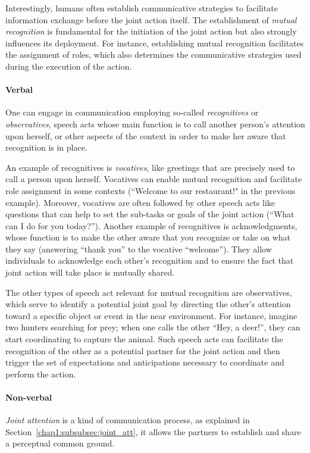 \documentclass[a4paper,11pt,twoside]{StyleThese}
\begin{document}
Interestingly, humans often establish communicative strategies to facilitate information exchange before the joint action itself. The establishment of \emph{mutual recognition} is fundamental for the initiation of the joint action but also strongly influences its deployment. For instance, establishing mutual recognition facilitates the assignment of roles, which also determines the communicative strategies used during the execution of the action. 

\paragraph{Verbal} One can engage in communication employing so-called \emph{recognitives} or \emph{observatives}, speech acts whose main function is to call another person’s attention upon herself, or other aspects of the context in order to make her aware that recognition is in place. 

An example of recognitives is \emph{vocatives}, like greetings that are precisely used to call a person upon herself. Vocatives can enable mutual recognition and facilitate role assignment in some contexts (\eg ``Welcome to our restaurant!" in the previous example). Moreover, vocatives are often followed by other speech acts like questions that can help to set the sub-tasks or goals of the joint action (\eg ``What can I do for you today?''). Another example of recognitives is acknowledgments, whose function is to make the other aware that you recognize or take on what they say (\eg answering ``thank you'' to the vocative ``welcome''). They allow individuals to acknowledge each other's recognition and to ensure the fact that joint action will take place is mutually shared. 

The other types of speech act relevant for mutual recognition are observatives, which serve to identify a potential joint goal by directing the other’s attention toward a specific object or event in the near environment. For instance, imagine two hunters searching for prey; when one calls the other ``Hey, a deer!'', they can start coordinating to capture the animal. Such speech acts can facilitate the recognition of the other as a potential partner for the joint action and then trigger the set of expectations and anticipations necessary to coordinate and perform the action.

\paragraph{Non-verbal} \emph{Joint attention} is a kind of communication process, as explained in Section~\ref{chap1:subsubsec:joint_att}, it allows the partners to establish and share a perceptual common ground.
\end{document}
